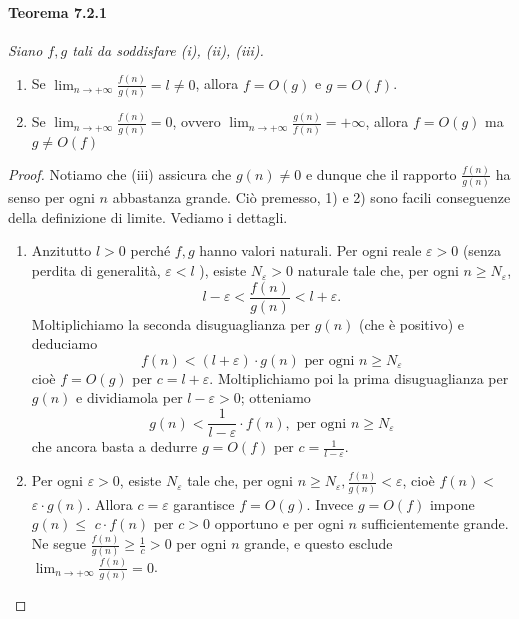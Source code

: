 \paragraph{Teorema 7.2.1} \textit{Siano $f, g$ tali da soddisfare (i), (ii), (iii).}
\begin{enumerate}
    \item Se $\lim _{n \rightarrow+\infty}
              \frac{f(n)}{g(n)}=l \neq 0$, allora $f=O(g)$ e $g=O(f)$.
    \item Se $\lim _{n
                  \rightarrow+\infty} \frac{f(n)}{g(n)}=0$, ovvero $\lim _{n \rightarrow+\infty}
              \frac{g(n)}{f(n)}=+\infty$, allora $f=O(g)$ ma $g \neq O(f)$
\end{enumerate}

\begin{proof}
    Notiamo che (iii) assicura che $g(n) \neq 0$ e dunque che il
    rapporto $\frac{f(n)}{g(n)}$ ha senso per ogni $n$ abbastanza grande. Ciò
    premesso, 1) e 2) sono facili conseguenze della definizione di limite. Vediamo i
    dettagli.
    \begin{enumerate}

        \item Anzitutto $l>0$ perché $f, g$ hanno valori naturali. Per ogni reale
              $\varepsilon>0$ (senza perdita di generalità, $\varepsilon<l$ ), esiste
              $N_{\varepsilon}>0$ naturale tale che, per ogni $n \geq N_{\varepsilon}$,
              $$
                  l-\varepsilon<\frac{f(n)}{g(n)}<l+\varepsilon .
              $$
              Moltiplichiamo la seconda disuguaglianza per $g(n)$ (che è positivo) e deduciamo
              $$
                  f(n)<(l+\varepsilon) \cdot g(n) \text { per ogni } n \geq N_{\varepsilon}
              $$
              cioè $f=O(g)$ per $c=l+\varepsilon$. Moltiplichiamo poi la prima disuguaglianza
              per $g(n)$ e dividiamola per $l-\varepsilon>0$; otteniamo
              $$
                  g(n)<\frac{1}{l-\varepsilon} \cdot f(n), \text { per ogni } n \geq N_{\varepsilon}
              $$
              che ancora basta a dedurre $g=O(f)$ per $c=\frac{1}{l-\varepsilon}$.
        \item Per ogni
              $\varepsilon>0$, esiste $N_{\varepsilon}$ tale che, per ogni $n \geq
                  N_{\varepsilon}, \frac{f(n)}{g(n)}<\varepsilon$, cioè $f(n)<$ $\varepsilon \cdot
                  g(n)$. Allora $c=\varepsilon$ garantisce $f=O(g)$. Invece $g=O(f)$ impone $g(n)
                  \leq$ $c \cdot f(n)$ per $c>0$ opportuno e per ogni $n$ sufficientemente grande.
              Ne segue $\frac{f(n)}{g(n)} \geq \frac{1}{c}>0$ per ogni $n$ grande, e questo
              esclude $\lim _{n \rightarrow+\infty} \frac{f(n)}{g(n)}=0$.
    \end{enumerate}
\end{proof}